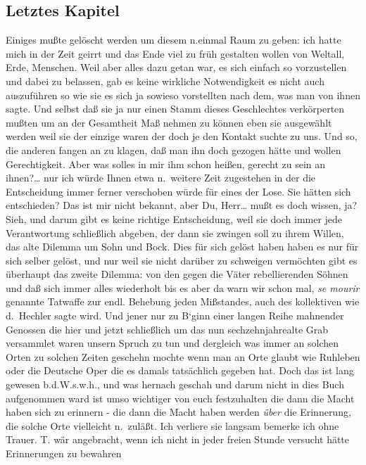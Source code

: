 \documentclass[
]{article}
\author{}
\date{\vspace{-2.5em}}
\begin{document}
\subsection{Letztes Kapitel}\label{letztes-kapitel}

Einiges mußte gelöscht werden um diesem n.einmal Raum zu geben: ich
hatte mich in der Zeit geirrt und das Ende viel zu früh gestalten wollen
von Weltall, Erde, Menschen. Weil aber alles dazu getan war, es sich
einfach so vorzustellen und dabei zu belassen, gab es keine wirkliche
Notwendigkeit es nicht auch auszuführen so wie sie es sich ja sowieso
vorstellten nach dem, was man von ihnen sagte. Und selbst daß sie ja nur
einen Stamm dieses Geschlechtes verkörperten mußten um an der Gesamtheit
Maß nehmen zu können eben sie ausgewählt werden weil sie der einzige
waren der doch je den Kontakt suchte zu uns. Und so, die anderen fangen
an zu klagen, daß man ihn doch gezogen hätte und wollen Gerechtigkeit.
Aber was solles in mir ihm schon heißen, gerecht zu sein an
ihnen?\ldots{} nur ich würde Ihnen etwa n.~weitere Zeit zugestehen in
der die Entscheidung immer ferner verschoben würde für eines der Lose.
Sie hätten sich entschieden? Das ist mir nicht bekannt, aber Du,
Herr\ldots{} mußt es doch wissen, ja? Sieh, und darum gibt es keine
richtige Entscheidung, weil sie doch immer jede Verantwortung
schließlich abgeben, der dann sie zwingen soll zu ihrem Willen, das alte
Dilemma um Sohn und Bock. Dies für sich gelöst haben haben es nur für
sich selber gelöst, und nur weil sie nicht darüber zu schweigen
vermöchten gibt es überhaupt das zweite Dilemma: von den gegen die Väter
rebellierenden Söhnen und daß sich immer alles wiederholt bis es aber da
warn wir schon mal, \emph{se mourir} genannte Tatwaffe zur endl.
Behebung jeden Mißstandes, auch des kollektiven wie d.~Hechler sagte
wird. Und jener nur zu B`ginn einer langen Reihe mahnender Genossen die
hier und jetzt schließlich um das nun sechzehnjahrealte Grab versammlet
waren unsern Spruch zu tun und dergleich was immer an solchen Orten zu
solchen Zeiten geschehn mochte wenn man an Orte glaubt wie Ruhleben oder
die Deutsche Oper die es damals tatsächlich gegeben hat. Doch das ist
lang gewesen b.d.W.s.w.h., und was hernach geschah und darum nicht in
dies Buch aufgenommen ward ist umso wichtiger von euch festzuhalten die
dann die Macht haben sich zu erinnern - die dann die Macht haben werden
\emph{über} die Erinnerung, die solche Orte vielleicht n.~zuläßt. Ich
verliere sie langsam bemerke ich ohne Trauer. T. wär angebracht, wenn
ich nicht in jeder freien Stunde versucht hätte Erinnerungen zu bewahren
\end{document}
